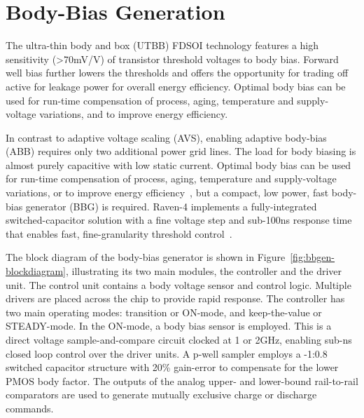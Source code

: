 \documentclass[graybox]{svmult}
\begin{document}
\section{Body-Bias Generation}

The ultra-thin body and box (UTBB) FDSOI technology features a high sensitivity (>70mV/V) of transistor threshold voltages to body bias.
Forward well bias further lowers the thresholds and offers the opportunity for trading off active for leakage power for overall energy efficiency.
Optimal body bias can be used for run-time compensation of process, aging, temperature and supply-voltage variations, and to improve energy efficiency.

In contrast to adaptive voltage scaling (AVS), enabling adaptive body-bias (ABB) requires only two additional power grid lines.
The load for body biasing is almost purely capacitive with low static current.
Optimal body bias can be used for run-time compensation of process, aging, temperature and supply-voltage variations, or to improve energy efficiency~\cite{Tschanz2002}, but a compact, low power, fast body-bias generator (BBG) is required.
Raven-4 implements a fully-integrated switched-capacitor solution with a fine voltage step and sub-100ns response time that enables fast, fine-granularity threshold control~\cite{Blagojevic2016}.

The block diagram of the body-bias generator is shown in Figure~\ref{fig:bbgen-blockdiagram}, illustrating its two main modules, the controller and the driver unit.
The control unit contains a body voltage sensor and control logic.
Multiple drivers are placed across the chip to provide rapid response.
The controller has two main operating modes: transition or ON-mode, and keep-the-value or STEADY-mode.
In the ON-mode, a body bias sensor is employed.
This is a direct voltage sample-and-compare circuit clocked at 1 or 2GHz, enabling sub-ns closed loop control over the driver units.
A p-well sampler employs a -1:0.8 switched capacitor structure with 20\% gain-error to compensate for the lower PMOS body factor.
The outputs of the analog upper- and lower-bound rail-to-rail comparators are used to generate mutually exclusive charge or discharge commands.
\end{document}
